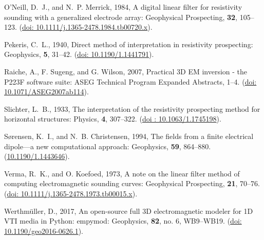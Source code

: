 \documentclass[paper,twocolumn,twoside]{geophysics}
\begin{document}
\begin{thebibliography}{}
O'Neill, D.~J., and N.~P. Merrick,  1984, A digital linear filter for
  resistivity sounding with a generalized electrode array: Geophysical
  Prospecting, {\bf 32}, 105--123.
\newblock (\href{http://doi.org/10.1111/j.1365-2478.1984.tb00720.x}{doi:
  10.1111/j.1365-2478.1984.tb00720.x}).

Pekeris, C.~L.,  1940, Direct method of interpretation in resistivity
  prospecting: Geophysics, {\bf 5}, 31--42.
\newblock (\href{https://doi.org/10.1190/1.1441791}{doi: 10.1190/1.1441791}).

Raiche, A., F. Sugeng, and G. Wilson,  2007, Practical {3D} {EM} inversion -
  the {P223F} software suite: ASEG Technical Program Expanded Abstracts,  1--4.
\newblock (\href{http://doi.org/10.1071/ASEG2007ab114}{doi:
  10.1071/ASEG2007ab114}).

Slichter, L.~B.,  1933, The interpretation of the resistivity prospecting
  method for horizontal structures: Physics, {\bf 4}, 307--322.
\newblock (\href{http://doi.org/10.1063/1.1745198}{doi : 10.1063/1.1745198}).

Sørensen, K.~I., and N.~B. Christensen,  1994, The fields from a finite
  electrical dipole—a new computational approach: Geophysics, {\bf 59},
  864--880.
\newblock (\href{https://doi.org/10.1190/1.1443646}{10.1190/1.1443646}).

Verma, R.~K., and O. Koefoed,  1973, A note on the linear filter method of
  computing electromagnetic sounding curves: Geophysical Prospecting, {\bf 21},
  70--76.
\newblock (\href{http://doi.org/10.1111/j.1365-2478.1973.tb00015.x}{doi:
  10.1111/j.1365-2478.1973.tb00015.x}).

Werthmüller, D., 2017, An open-source full {3D} electromagnetic modeler for
  {1D} {VTI} media in {P}ython: empymod: Geophysics, {\bf 82}, no. 6,
  WB9--WB19.
\newblock (\href{http://doi.org/10.1190/geo2016-0626.1}{doi:
  10.1190/geo2016-0626.1}).

\end{thebibliography}
\end{document}
